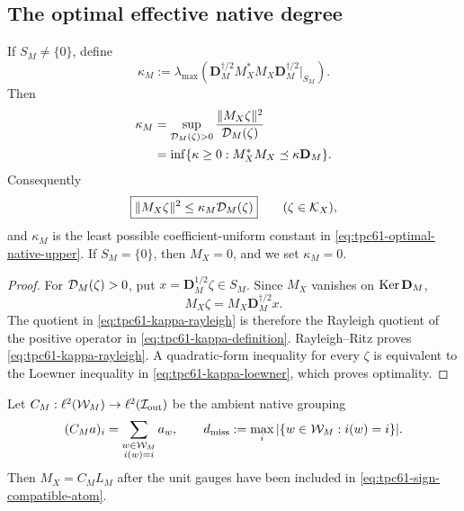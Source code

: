 \subsection{The optimal effective native degree}

\begin{theorem}
\label{thm:tpc61-optimal-kappa}
If \(S_M\ne\{0\}\), define
\begin{equation}
 \boxed{
 \kappa_M:=
 \lambda_{\max}\!\left(
  \mathbf D_M^{\dagger/2}M_X^*M_X
  \mathbf D_M^{\dagger/2}\big|_{S_M}
 \right).}
 \label{eq:tpc61-kappa-definition}
\end{equation}
Then
\begin{align}
 \kappa_M
 &=\sup_{\mathcal D_M(\zeta)>0}
   \frac{\|M_X\zeta\|^2}{\mathcal D_M(\zeta)}
 \label{eq:tpc61-kappa-rayleigh}\\
 &=\inf\{\kappa\ge0:
       M_X^*M_X\preceq\kappa\mathbf D_M\}.
 \label{eq:tpc61-kappa-loewner}
\end{align}
Consequently
\begin{equation}
 \boxed{
 \|M_X\zeta\|^2\le\kappa_M\mathcal D_M(\zeta)}
 \qquad(\zeta\in\mathcal K_X),
 \label{eq:tpc61-optimal-native-upper}
\end{equation}
and \(\kappa_M\) is the least possible coefficient-uniform constant in
\eqref{eq:tpc61-optimal-native-upper}.  If \(S_M=\{0\}\), then
\(M_X=0\), and we set \(\kappa_M=0\).
\end{theorem}

\begin{proof}
For \(\mathcal D_M(\zeta)>0\), put
\(x=\mathbf D_M^{1/2}\zeta\in S_M\).  Since \(M_X\) vanishes on
\(\operatorname{Ker}\mathbf D_M\),
\[
 M_X\zeta=M_X\mathbf D_M^{\dagger/2}x.
\]
The quotient in \eqref{eq:tpc61-kappa-rayleigh} is therefore the Rayleigh
quotient of the positive operator in
\eqref{eq:tpc61-kappa-definition}.  Rayleigh--Ritz proves
\eqref{eq:tpc61-kappa-rayleigh}.  A quadratic-form inequality for every
\(\zeta\) is equivalent to the Loewner inequality in
\eqref{eq:tpc61-kappa-loewner}, which proves optimality.
\end{proof}

Let \(C_M:\ell^2(\mathcal W_M)\to\ell^2(\mathcal I_{\rm out})\) be the ambient native
grouping
\begin{equation}
 (C_Ma)_i=\sum_{\substack{w\in\mathcal W_M\\i(w)=i}}a_w,
 \qquad
 d_{\rm miss}:=\max_i|\{w\in\mathcal W_M:i(w)=i\}|.
 \label{eq:tpc61-ambient-native-grouping}
\end{equation}
Then \(M_X=C_ML_M\) after the unit gauges have been included in
\eqref{eq:tpc61-sign-compatible-atom}.

